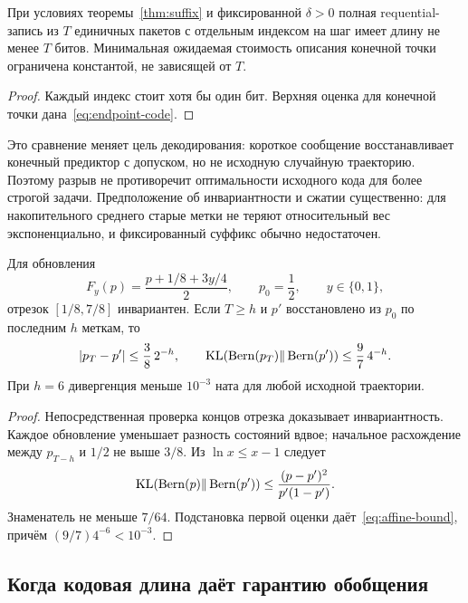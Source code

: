 \begin{corollary}
\label{cor:gap}
При условиях теоремы~\ref{thm:suffix} и фиксированной $\delta>0$ полная
requential-запись из $T$ единичных пакетов с отдельным индексом на шаг
имеет длину не менее $T$ битов. Минимальная ожидаемая стоимость описания
конечной точки ограничена константой, не зависящей от $T$.
\end{corollary}
\begin{proof}
Каждый индекс стоит хотя бы один бит. Верхняя оценка для конечной точки
дана~\eqref{eq:endpoint-code}.
\end{proof}

Это сравнение меняет цель декодирования: короткое сообщение восстанавливает
конечный предиктор с допуском, но не исходную случайную траекторию. Поэтому
разрыв не противоречит оптимальности исходного кода для более строгой задачи.
Предположение об инвариантности и сжатии существенно: для накопительного
среднего старые метки не теряют относительный вес экспоненциально, и
фиксированный суффикс обычно недостаточен.

\begin{corollary}
\label{cor:affine}
Для обновления
\begin{equation}
 F_y(p)=\frac{p+1/8+3y/4}{2},\qquad
 p_0=\frac12,\qquad y\in\{0,1\},
 \label{eq:affine}
\end{equation}
отрезок $[1/8,7/8]$ инвариантен. Если $T\ge h$ и $p'$ восстановлено из
$p_0$ по последним $h$ меткам, то
\begin{equation}
 |p_T-p'|\le\frac38\,2^{-h},\qquad
 \operatorname{KL}(\operatorname{Bern}(p_T)\Vert\operatorname{Bern}(p'))\le\frac97\,4^{-h}.
 \label{eq:affine-bound}
\end{equation}
При $h=6$ дивергенция меньше $10^{-3}$ ната для любой исходной траектории.
\end{corollary}
\begin{proof}
Непосредственная проверка концов отрезка доказывает инвариантность.
Каждое обновление уменьшает разность состояний вдвое; начальное расхождение
между $p_{T-h}$ и $1/2$ не выше $3/8$.
Из $\ln x\le x-1$ следует
\[
 \operatorname{KL}(\operatorname{Bern}(p)\Vert\operatorname{Bern}(p'))
 \le\frac{(p-p')^2}{p'(1-p')}.
\]
Знаменатель не меньше $7/64$. Подстановка первой оценки
даёт~\eqref{eq:affine-bound}, причём $(9/7)4^{-6}<10^{-3}$.
\end{proof}

\subsection{Когда кодовая длина даёт гарантию обобщения}

